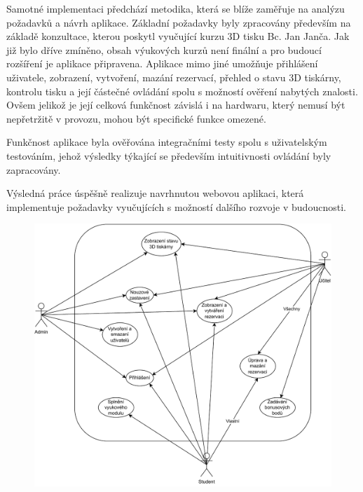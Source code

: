 \documentclass[twoside, 12pt]{article}
\begin{document}
Samotné implementaci předchází metodika, která se blíže zaměřuje na analýzu požadavků a návrh aplikace. Základní požadavky byly zpracovány především na základě konzultace, kterou poskytl vyučující kurzu 3D tisku Bc. Jan Janča. Jak již bylo dříve zmíněno, obsah výukových kurzů není finální a pro budoucí rozšíření je aplikace připravena.
Aplikace mimo jiné umožňuje přihlášení uživatele, zobrazení, vytvoření, mazání rezervací, přehled o stavu 3D tiskárny, kontrolu tisku a její částečné ovládání spolu s možností ověření nabytých znalosti. Ovšem jelikož je její celková funkčnost závislá i na hardwaru, který nemusí být nepřetržitě v provozu, mohou být specifické funkce omezené.

Funkčnost aplikace byla ověřována integračními testy spolu s uživatelským testováním, jehož výsledky týkající se především intuitivnosti ovládání byly zapracovány.

Výsledná práce úspěšně realizuje navrhnutou webovou aplikaci, která implementuje požadavky vyučujících s možností dalšího rozvoje v budoucnosti.











\printbibliography[heading=none]




\prilohy
{}
\label{UseCasePDFpismeno}
\begin{figure}[htbp]
\centering
\includegraphics[angle=90, width=14cm]{UseCase.pdf}
\end{figure}
\end{document}
